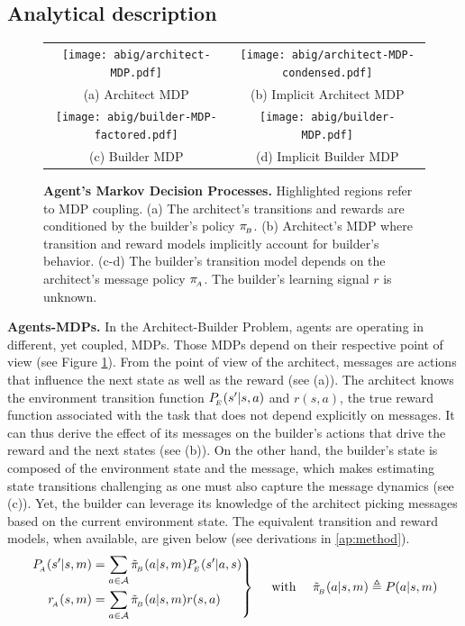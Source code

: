 \subsection{Analytical description}
\begin{figure}[!h]
    \centering
    \begin{tabular}{cc}
         \texttt{[image: abig/architect-MDP.pdf]} & \texttt{[image: abig/architect-MDP-condensed.pdf]}  \\
        \small (a) Architect MDP & \small (b) Implicit Architect MDP\\
        \texttt{[image: abig/builder-MDP-factored.pdf]} & \texttt{[image: abig/builder-MDP.pdf]} \\
        \small (c) Builder MDP & \small (d) Implicit Builder MDP
    \end{tabular}
    \caption{\textbf{Agent's Markov Decision Processes.} Highlighted regions refer to MDP coupling. (a) The architect's transitions and rewards are conditioned by the builder's policy $\pi_{\!_B}$. (b) Architect's MDP where transition and reward models implicitly account for builder's behavior. (c-d) The builder's transition model depends on the architect's message policy $\pi_{\!_A}$. The builder's learning signal $r$ is unknown.}
    \label{fig:mdp-graphs}
\end{figure}
\textbf{Agents-MDPs. } In the Architect-Builder Problem, agents are operating in different, yet coupled, MDPs. Those MDPs depend on their respective point of view (see Figure \ref{fig:mdp-graphs}).
\label{ap:pb-definition}
From the point of view of the architect, messages are actions that influence the next state as well as the reward (see  (a)). The architect knows the environment transition function $P_{\!_E}(s'|s,a)$ and $r(s,a)$, the true reward function associated with the task that does not depend explicitly on messages. It can thus derive the effect of its messages on the builder's actions that drive the reward and the next states (see  (b)). On the other hand, the builder's state is composed of the environment state and the message, which makes estimating state transitions challenging as one must also capture the message dynamics (see  (c)). Yet, the builder can leverage  its knowledge of the architect picking messages based on the current environment state. The equivalent transition and reward models, when available, are given below (see derivations in \ap\ref{ap:method}). 
\begin{equation}
\label{eq:mdp-models}
\left.\begin{split}
    P_{\!_A}(s'|s,m) &= \sum_{a\in{\mathcal{A}}} \tilde{\pi}_{\!_B}(a|s,m) P_{\!_E}(s'|a,s) \\ 
    r_{\!_A}(s,m) &= \sum_{a\in{\mathcal{A}}}\tilde{\pi}_{\!_B}(a|s,m)r(s,a) 
\end{split}\right\} \quad \text{ with } \quad \tilde{\pi}_{\!_B}(a|s,m) \triangleq P(a|s,m)
\end{equation}
